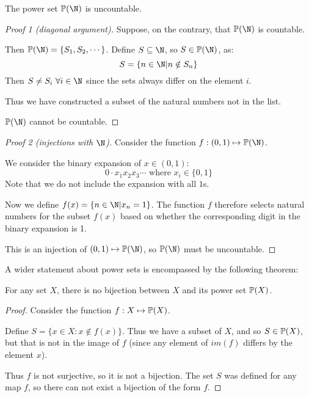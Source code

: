 \documentclass[../Main.tex]{subfiles}
\begin{document}
\begin{theorem}
    The power set $\powerset{\N}$ is uncountable.
\end{theorem}
\begin{proof}[Proof 1 (diagonal argument)]
    Suppose, on the contrary, that $\powerset{\N}$ is countable.\par
    Then $\powerset{\N} = \{S_1, S_2, \cdots\}$.
    Define $S \subseteq \N$, so $S \in \powerset{\N}$, as:
    \begin{equation*}
        S = \{n \in \N | n \notin S_n\}
    \end{equation*}
    Then $S \neq S_i~\forall i \in \N$ since the sets always differ on the element $i$.\par
    Thus we have constructed a subset of the natural numbers not in the list.\contradiction\par
    $\powerset{\N}$ cannot be countable.
\end{proof}
\begin{proof}[Proof 2 (injections with $\N$)]
    Consider the function $f : (0, 1) \mapsto \powerset{\N}$.\par
    We consider the binary expansion of $x \in (0, 1)$:
    \begin{equation*}
        0 \cdot x_1 x_2 x_3 \cdots \text{ where } x_i \in \{0, 1\}
    \end{equation*}
    Note that we do not include the expansion with all $1$s.\par
    Now we define $f(x) = \{n \in \N | x_n = 1\}$. The function $f$ therefore selects natural numbers for the subset $f(x)$ based on whether the corresponding digit in the binary expansion is 1.\par
    This is an injection of $(0, 1) \mapsto \powerset{\N}$, so $\powerset{\N}$ must be uncountable.
\end{proof}
A wider statement about power sets is encompassed by the following theorem:
\begin{theorem}
    For any set $X$, there is no bijection between $X$ and its power set $\mathbb{P}(X)$.
\end{theorem}
\begin{proof}
    Consider the function $f : X \mapsto \mathbb{P}(X)$.\par
    Define $S = \{x \in X : x \notin f(x)\}$.
    Thus we have a subset of $X$, and so $S \in \mathbb{P}(X)$, but that is not in the image of $f$ (since any element of $im(f)$ differs by the element $x$).\par
    Thus $f$ is not surjective, so it is not a bijection. The set $S$ was defined for any map $f$, so there can not exist a bijection of the form $f$.
\end{proof}
\end{document}
